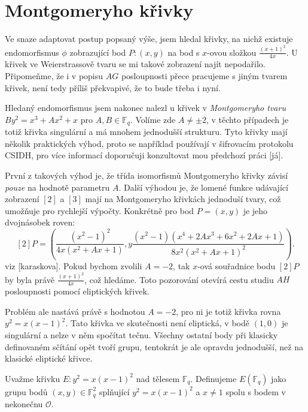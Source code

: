 \documentclass[12pt]{report}
\begin{document}
\section{Montgomeryho křivky}

Ve snaze adaptovat postup popsaný výše, jsem hledal křivky, na nichž existuje endomorfismus $\phi$ zobrazující bod $P : (x,y)$ na bod s $x$-ovou složkou $\frac{(x+1)^2}{4x}$. U křivek ve Weierstrassově tvaru se mi takové zobrazení najít nepodařilo. Připomeňme, že i v popisu $AG$ posloupnosti přece pracujeme s jiným tvarem křivek, není tedy příliš překvapivé, že to bude třeba i nyní.

Hledaný endomorfismus jsem nakonec nalezl u křivek v \textit{Montgomeryho tvaru} $ B y^2 = x^3 + A x^2 +x$ pro $A,B \in \mathbb{F}_q$. Volíme zde $A \neq \pm 2$, v těchto případech je totiž křivka singulární a má mnohem jednodušší strukturu. Tyto křivky mají několik praktických výhod, proto se například používají v šifrovacím protokolu CSIDH, pro více informací doporučuji konzultovat mou předchozí práci [já].

První z takových výhod je, že třída isomorfismů Montgomeryho křivky závisí \textit{pouze} na hodnotě parametru $A$. Další výhodou je, že lomené funkce udávající zobrazení $[2]$ a $[3]$ mají na Montgomeryho křivkách jednoduší tvary, což umožňuje pro rychlejší výpočty. Konkrétně pro bod $P = (x,y)$ je jeho dvojnásobek roven:
$$[2] P = \left(\frac{(x^2-1)^2}{4x(x^2+Ax+1)},y \frac{(x^2-1)(x^4+2 A x^3 + 6x^2 + 2 Ax + 1)}{8 x^2 (x^2+Ax+1)^2} \right).$$
viz [karaskova]. Pokud bychom zvolili $A = -2$, tak $x$-ová souřadnice bodu $[2]P$ by byla právě $\frac{(x+1)^2}{4x}$, což hledáme. Toto pozorování otevírá cestu studiu $AH$ posloupnosti pomocí eliptických křivek.

Problém ale nastává právě s hodnotou $A=-2$, pro ni je totiž křivka rovna $y^2 = x(x-1)^2$. Tato křivka ve skutečnosti není eliptická, v bodě $(1,0)$ je singulární a nelze v něm spočítat tečnu. Všechny ostatní body při klasicky definovaném sčítání opět tvoří grupu, tentokrát je ale opravdu jednodušší, než na klasické eliptické křivce.

\begin{definice}
Uvažme křivku $E : y^2 = x(x-1)^2$ nad tělesem $\mathbb{F}_q$. Definujeme $E(\mathbb{F}_q)$ jako grupu bodů $(x,y) \in \mathbb{F}_q ^2$ splňující $y^2 = x(x-1)^2$ a $x \neq 1$ spolu s bodem v nekonečnu $\mathcal{O}$. 
\end{definice}
\end{document}
